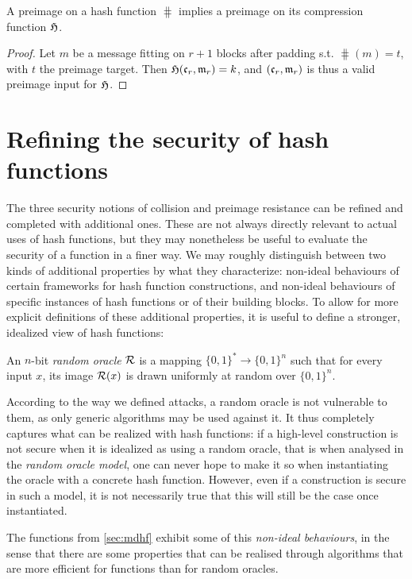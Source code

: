 \begin{prop}
A preimage on a \merkdam hash function $\hash$ implies a preimage on its compression function $\operatorname{\mathfrak{H}}$.
\end{prop}
\begin{proof}
Let $m$ be a message fitting on $r+1$ blocks after padding s.t. $\hash(m) = t$, with $t$ the preimage target.
Then $\operatorname{\mathfrak{H}}(\mathfrak{c}_r, \mathfrak{m}_r) = k$, and $(\mathfrak{c}_r, \mathfrak{m}_r)$ is thus a valid preimage input for $\operatorname{\mathfrak{H}}$.
\end{proof}

\section{Refining the security of hash functions}
\label{sec:refining_md}

The three security notions of collision and preimage resistance can be refined and completed with additional ones. These are not always directly relevant to actual uses of hash functions, but they may nonetheless be useful to evaluate the security
of a function in a finer way. We may roughly distinguish between two kinds of additional properties by what they characterize: non-ideal behaviours of certain frameworks for hash function constructions, and non-ideal
behaviours of specific instances of hash functions or of their building blocks.
To allow for more explicit definitions of these additional properties, it is useful to define a stronger, idealized view of hash functions:

\begin{defi}
An $n$-bit \emph{random oracle} $\operatorname{\mathcal{R}}$ is a mapping $\{0,1\}^* \rightarrow \{0,1\}^n$ such that for every input $x$, its image $\operatorname{\mathcal{R}}(x)$ is drawn uniformly at random over $\{0,1\}^n$.
\end{defi}

According to the way we defined attacks, a random oracle is not vulnerable to them, as only generic algorithms may be used against it. It thus completely captures what
can be realized with hash functions: if a high-level construction is not secure when it is idealized as using a random oracle, that is
when analysed in the \emph{random oracle model},
one can never hope to make it so when instantiating the oracle with a concrete hash function. However, even if a construction is secure in such a model, it is not necessarily true that
this will still be the case once instantiated.

The \merkdam functions from \autoref{sec:mdhf} exhibit some of this \emph{non-ideal behaviours},
in the sense that there are some properties that can be realised through algorithms that are more efficient for \merkdam functions than for random oracles.

